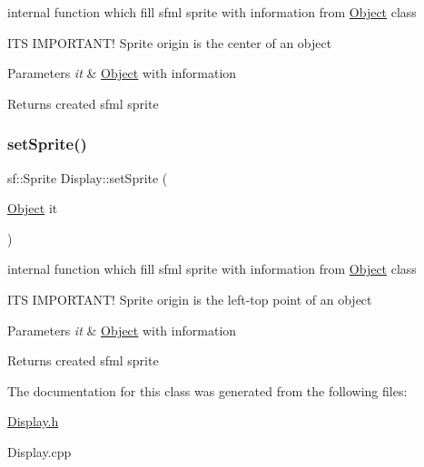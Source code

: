 internal function which fill sfml sprite with information from \hyperlink{class_object}{Object} class 

IT\textquotesingle{}S I\+M\+P\+O\+R\+T\+A\+N\+T! Sprite origin is the center of an object 
\begin{DoxyParams}{Parameters}
{\em it} & \hyperlink{class_object}{Object} with information \\
\hline
\end{DoxyParams}
\begin{DoxyReturn}{Returns}
created sfml sprite 
\end{DoxyReturn}
\mbox{\label{class_display_aadebd92927d32d9766bc2d7bfff272f3}} 
\subsubsection{\texorpdfstring{set\+Sprite()}{setSprite()}}
{\footnotesize\ttfamily sf\+::\+Sprite Display\+::set\+Sprite (\begin{DoxyParamCaption}\item[{\hyperlink{class_object}{Object}}]{it }\end{DoxyParamCaption})\hspace{0.3cm}{\ttfamily [protected]}}



internal function which fill sfml sprite with information from \hyperlink{class_object}{Object} class 

IT\textquotesingle{}S I\+M\+P\+O\+R\+T\+A\+N\+T! Sprite origin is the left-\/top point of an object 
\begin{DoxyParams}{Parameters}
{\em it} & \hyperlink{class_object}{Object} with information \\
\hline
\end{DoxyParams}
\begin{DoxyReturn}{Returns}
created sfml sprite 
\end{DoxyReturn}


The documentation for this class was generated from the following files\+:\begin{DoxyCompactItemize}
\item 
\hyperlink{_display_8h}{Display.\+h}\item 
Display.\+cpp\end{DoxyCompactItemize}
